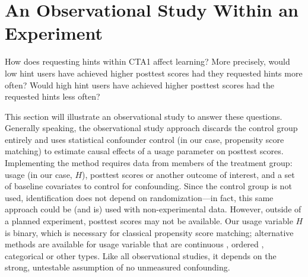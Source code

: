 \documentclass{article}\usepackage[]{graphicx}\usepackage[]{color}
\begin{document}
\begin{table}[ht]
\centering

\caption{Missingness information, control (``BaU'' or ``Business as
  Usual'') and treatment (``CTA1'') means, and balance for the
  covariates included in this study, from the high school year two
  stratum of CTA1 Effectiveness experiment. Imputation error is percent falsely classified for
  categorical variables (Race/Ethnicity, Sex, and Special Education)
  and standardized root mean squared error for Pretest, which is
  continuous. %
  Analysis done in \texttt{R} via \texttt{RItools} \citep{ritools}.}
\label{tab:covariateBalance}
\end{table}


\section{An Observational Study Within an Experiment}\label{sec:observational}

How does requesting hints within CTA1 affect learning?
More precisely, would low hint users have achieved higher posttest scores
had they requested hints more often?
Would high hint users have achieved higher posttest scores had the
requested hints less often?

This section will illustrate an observational study to answer these
questions.
Generally speaking, the observational study approach discards the
control group entirely and uses statistical confounder control (in our
case, propensity score matching) to estimate causal effects of a usage parameter on posttest scores.
Implementing the method requires data from members of the treatment group: usage (in our case, $H$), posttest scores or another outcome of interest, and a set of baseline covariates to control for confounding.
Since the control group is not used, identification does not depend on randomization---in fact, this same approach could be (and is) used with non-experimental data.
However, outside of a planned experiment, posttest scores may not be available.
Our usage variable $H$ is binary, which is necessary for classical propensity score matching; alternative methods are available for usage variable that are continuous \citep[e.g.][]{hirano2004propensity}, ordered \citep[e.g.][]{leon2005mixed}, categorical \citep[e.g.][]{lopez2017estimation} or other types.
Like all observational studies, it depends on the strong, untestable assumption of no unmeasured confounding.
\end{document}
